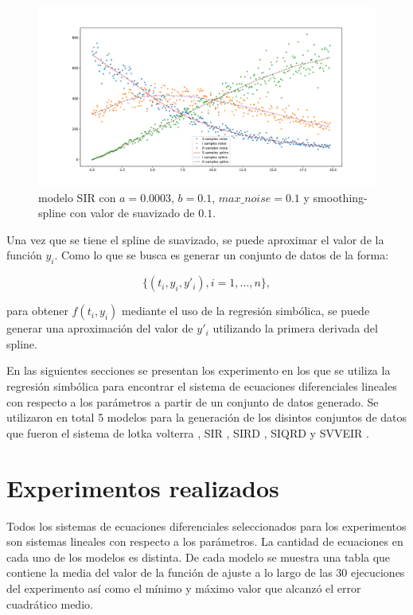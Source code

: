 \begin{figure}[h]
    \centering
    \includegraphics[width=\textwidth]{"figures/SIR_noise_with_spline.pdf"}
    \caption{modelo SIR con $a = 0.0003$, $b = 0.1$, $max\_noise = 0.1$ y smoothing-spline con valor de suavizado de $0.1$.}
    \label{fig:SIR_noise_with_spline}
\end{figure}

Una vez que se tiene el spline de suavizado, se puede aproximar el valor de la función $y_i$. Como lo que se busca es generar un conjunto de datos de la forma:

$$\{(t_i, y_i, y'_i), i=1, \dots, n\},$$

para obtener $f(t_i, y_i)$ mediante el uso de la regresión simbólica, se puede generar una aproximación del valor de $y'_i$ utilizando la primera derivada del spline.

En las siguientes secciones se presentan los experimento en los que se utiliza la regresión simbólica para encontrar el sistema de ecuaciones diferenciales lineales con respecto a los parámetros a partir de un conjunto de datos generado. Se utilizaron en total 5 modelos para la generación de los disintos conjuntos de datos que fueron el sistema de lotka volterra \cite{Hoppensteadt:2006}, SIR \cite{weiss2013sir}, SIRD \cite{bailey1975mathematical}, SIQRD \cite{molter2021mathematical} y SVVEIR \cite{kuddus2021mathematical}.

\section{Experimentos realizados}\label{section:experiments}

Todos los sistemas de ecuaciones diferenciales seleccionados para los experimentos son sistemas lineales con respecto a los parámetros. La cantidad de ecuaciones en cada uno de los modelos es distinta. De cada modelo se muestra una tabla que contiene la media del valor de la función de ajuste a lo largo de las 30 ejecuciones del experimento así como el mínimo y máximo valor que alcanzó el error cuadrático medio.


